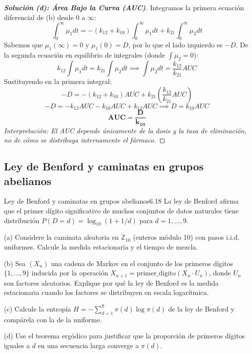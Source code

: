 \documentclass[10pt,a4paper]{article}
\begin{document}
\vspace{5mm}

\begin{proof}[\textbf{Solución (d): Área Bajo la Curva (AUC)}]
    Integramos la primera ecuación diferencial de (b) desde $0$ a $\infty$:
    \[ \int_0^\infty \dot{\mu}_1 dt = -(k_{12} + k_{10}) \int_0^\infty \mu_1 dt + k_{21} \int_0^\infty \mu_2 dt \]
    Sabemos que $\mu_1(\infty) = 0$ y $\mu_1(0) = D$, por lo que el lado izquierdo es $-D$.
    De la segunda ecuación en equilibrio de integrales (donde $\int \dot{\mu}_2 = 0$):
    \[ k_{12} \int \mu_1 dt = k_{21} \int \mu_2 dt \implies \int \mu_2 dt = \frac{k_{12}}{k_{21}} AUC \]
    Sustituyendo en la primera integral:
    \[ -D = -(k_{12} + k_{10}) AUC + k_{21} \left( \frac{k_{12}}{k_{21}} AUC \right) \]
    \[ -D = -k_{12} AUC - k_{10} AUC + k_{12} AUC \implies D = k_{10} AUC \]
    \[ \mathbf{AUC = \frac{D}{k_{10}}} \]
    \textit{Interpretación: El AUC depende únicamente de la dosis y la tasa de eliminación, no de cómo se distribuya internamente el fármaco.}
\end{proof}



\newpage

\subsection{Ley de Benford y caminatas en grupos abelianos}


\begin{ejercicio}{Ley de Benford y caminatas en grupos abelianos}{6.18}
    La ley de Benford afirma que el primer dígito significativo de muchos conjuntos de datos naturales tiene distribución $P(D = d) = \log_{10}(1 + 1/d)$ para $d = 1, \dots, 9$.
    
    (a) Considere la caminata aleatoria en $\mathbb{Z}_{10}$ (enteros módulo 10) con pasos i.i.d. uniformes. Calcule la medida estacionaria y el tiempo de mezcla.
    
    (b) Sea $(X_n)$ una cadena de Markov en el conjunto de los primeros dígitos $\{1, \dots, 9\}$ inducida por la operación $X_{n+1} = \text{primer\_digito}(X_n \cdot U_n)$, donde $U_n$ son factores aleatorios. Explique por qué la ley de Benford es la medida estacionaria cuando los factores se distribuyen en escala logarítmica.
    
    (c) Calcule la entropía $H = -\sum_{d=1}^9 \pi(d) \log \pi(d)$ de la ley de Benford y compárela con la de la uniforme.
    
    (d) Use el teorema ergódico para justificar que la proporción de primeros dígitos iguales a $d$ en una secuencia larga converge a $\pi(d)$.
\end{ejercicio}
\end{document}
